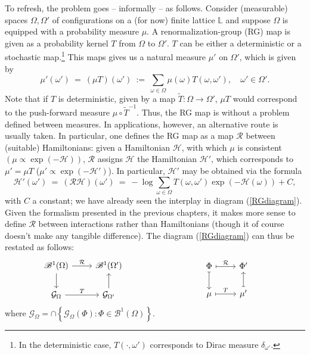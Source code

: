\documentclass[12pt]{article}
\newcommand{\BB}{\mathscr{B}}
\newcommand{\G}{\mathcal{G}}
\renewcommand{\H}{\mathcal{H}}
\renewcommand{\L}{\mathbb{L}}
\newcommand{\RR}{\mathcal{R}}
\newcommand{\set}[1]{\left\{#1\right\}}
\newcommand{\ra}{\rightarrow}
\newcommand{\pika}{\boldsymbol{\cdot}}
\newcommand{\1}{\mathbbm{1}}
\newcommand{\5}{\vspace{0.5cm}}
\renewcommand{\tilde}{\widetilde}
\theoremstyle{definition}
\begin{document}
To refresh, the problem goes -- informally -- as follows. Consider (measurable) spaces $\Omega,\Omega'$ of configurations on a (for now) finite lattice $\L$ and suppose $\Omega$ is equipped with a probability measure $\mu$. A renormalization-group (RG) map is given as a probability kernel $T$ from $\Omega$ to $\Omega'$. $T$ can be either a deterministic or a stochastic map.\footnote{In the deterministic case, $T(\pika,\omega')$ corresponds to Dirac measure $\delta_{\omega'}$.} This maps gives us a natural measure $\mu'$ on $\Omega'$, which is given by
$$\mu'(\omega') ~=~ (\mu T)(\omega') ~:=~ \sum_{\omega\in\Omega}\mu(\omega)T(\omega,\omega'), \quad \omega'\in\Omega'.$$
Note that if $T$ is deterministic, given by a map $\tilde{T}:\Omega\ra\Omega'$, $\mu T$ would correspond to the push-forward measure $\mu\circ \tilde{T}^{-1}$. Thus, the RG map is without a problem defined between measures. In applications, however, an alternative route is usually taken. In particular, one defines the RG map as a map $\RR$ between (suitable) Hamiltonians: given a Hamiltonian $\H$, with which $\mu$ is consistent $(\mu\propto \exp(-\H))$, $\RR$ assigns $\H$ the Hamiltonian $\H'$, which corresponds to $\mu'=\mu T$ ($\mu'\propto \exp(-\H')$). In particular, $\H'$ may be obtained via the formula
$$\H'(\omega') ~=~ (\RR\H)(\omega') ~=~ -\log\sum_{\omega\in\Omega} T(\omega,\omega')\exp(-\H(\omega)) + C,$$
with $C$ a constant; we have already seen the interplay in diagram (\ref{RGdiagram}). Given the formalism presented in the previous chapters, it makes more sense to define $\RR$ between interactions rather than Hamiltonians (though it of course doesn't make any tangible difference). The diagram (\ref{RGdiagram}) can thus be restated as follows:
$$\begin{minipage}{0.5\textwidth}
\centering
\begin{tikzcd}
    \BB^1(\Omega) \arrow[r, "\RR"] \arrow[d] & \BB^1(\Omega')  \\
    \G_\Omega \arrow[r, "T"] & \G_{\Omega'} \arrow[u]
\end{tikzcd}
\end{minipage}
\begin{minipage}{0.5\textwidth}
\centering
\begin{tikzcd}
    \Phi \arrow[r, mapsto, "\RR"] \arrow[d, mapsto] & \Phi' \\
    \mu \arrow[r, mapsto, "T"] & \mu' \arrow[u, mapsto]
\end{tikzcd}
\end{minipage}$$
where $\G_\Omega=\cap\set{\G_{\Omega}(\Phi):\Phi\in\BB^1(\Omega)}$. \\
\end{document}
